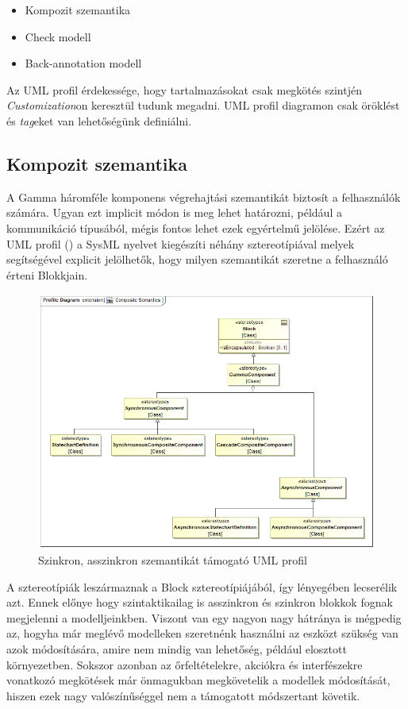 \begin{itemize}
	\item Kompozit szemantika
	\item Check modell
	\item Back-annotation modell
\end{itemize}

Az UML profil érdekessége, hogy tartalmazásokat csak megkötés szintjén \emph{Customization}on keresztül tudunk megadni. UML profil diagramon csak öröklést és \emph{tag}eket van lehetőségünk definiálni.

\subsection{Kompozit szemantika}

A Gamma háromféle komponens végrehajtási szemantikát biztosít a felhasználók számára. Ugyan ezt implicit módon is meg lehet határozni, például a kommunikáció típusából, mégis fontos lehet ezek egyértelmű jelölése. Ezért az UML profil () a SysML nyelvet kiegészíti néhány sztereotípiával melyek segítségével explicit jelölhetők, hogy milyen szemantikát szeretne a felhasználó érteni Blokkjain.

\begin{figure}[!ht]
	\centering
	\includegraphics[width=130mm, keepaspectratio]{figures/contribution/profile.png}
	\caption{Szinkron, asszinkron szemantikát támogató UML profil}
	\label{fig:comp-prof}
\end{figure}

A sztereotípiák leszármaznak a Block sztereotípiájából, így lényegében lecserélik azt. Ennek előnye hogy szintaktikailag is asszinkron és szinkron blokkok fognak megjelenni a modelljeinkben. Viszont van egy nagyon nagy hátránya is mégpedig az, hogyha már meglévő modelleken szeretnénk használni az eszközt szükség van azok módosítására, amire nem mindig van lehetőség, például elosztott környezetben. Sokszor azonban az őrfeltételekre, akciókra és interfészekre vonatkozó megkötések már önmagukban megkövetelik a modellek módosítását, hiszen ezek nagy valószínűséggel nem a támogatott módszertant követik.


